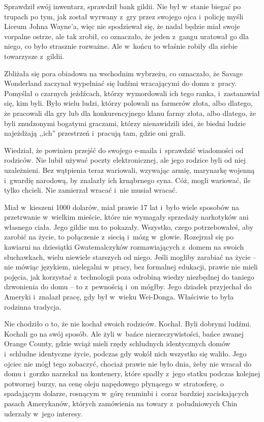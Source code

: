\documentclass[oneside,polish,11pt,rmheadings]{mwbk}
\begin{document}
Sprawdził swój inwentarz, sprawdził bank gildii. Nie był w~stanie biegać po trupach po tym, jak został wyrwany z~gry przez swojego ojca i~policję myśli Liceum Johna Wayne'a, więc nie spodziewał się, że nadal będzie miał swoje vorpalne ostrze, ale tak zrobił, co oznaczało, że jeden z~gangu uratował go dla niego, co było strasznie rozważne. Ale w~końcu to właśnie robiły dla siebie towarzysze z~gildii. 


Zbliżała się pora obiadowa na wschodnim wybrzeżu, co oznaczało, że Savage Wonderland zaczynał wypełniać się ludźmi wracającymi do domu z~pracy. Pomyślał o czarnych jeźdźcach, którzy wymordowali ich tego ranka, i~zastanawiał się, kim byli. Było wielu ludzi, którzy polowali na farmerów złota, albo dlatego, że pracowali dla gry lub dla konkurencyjnego klanu farmy złota, albo dlatego, że byli znudzonymi bogatymi graczami, którzy nienawidzili idei, że biedni ludzie najeżdżają ,,ich'' przestrzeń i~pracują tam, gdzie oni grali. 


Wiedział, że powinien przejść do swojego e-maila i~sprawdzić wiadomości od rodziców. Nie lubił używać poczty elektronicznej, ale jego rodzice byli od niej uzależnieni. Bez wątpienia teraz wariowali, wzywając armię, marynarkę wojenną i~gwardię narodową, by znalazły ich krnąbrnego syna. Cóż, mogli wariować, ile tylko chcieli. Nie zamierzał wracać i~nie musiał wracać. 


Miał w~kieszeni 1000 dolarów, miał prawie 17 lat i~było wiele sposobów na przetrwanie w~wielkim mieście, które nie wymagały sprzedaży narkotyków ani własnego ciała. Jego gildie mu to pokazały. Wszystko, czego potrzebowałeś, aby zarobić na życie, to połączenie z~siecią i~mózg w~głowie. Rozejrzał się po kawiarni na dziesiątki Gwatemalczyków rozmawiających z~domem na swoich słuchawkach, wielu niewiele starszych od niego. Jeśli mogliby zarabiać na życie -- nie mówiąc językiem, nielegalni w~pracy, bez formalnej edukacji, prawie nie mieli pojęcia, jak korzystać z~technologii poza odrobiną wiedzy niezbędnej do taniego dzwonienia do domu -- to z~pewnością i~on mógłby. Jego dziadek przyjechał do Ameryki i~znalazł pracę, gdy był w~wieku Wei-Donga. Właściwie to była rodzinna tradycja. 


Nie chodziło o to, że nie kochał swoich rodziców. Kochał. Byli dobrymi ludźmi. Kochali go na swój sposób. Ale żyli w~bańce nierzeczywistości, bańce zwanej Orange County, gdzie wciąż mieli rzędy schludnych identycznych domów i~schludne identyczne życie, podczas gdy wokół nich wszystko się waliło. Jego ojciec nie mógł tego zobaczyć, chociaż prawie nie było dnia, żeby nie wracał do domu i~gorzko narzekał na kontenery, które spadły z~jego statku podczas kolejnej potwornej burzy, na cenę oleju napędowego płynącego w~stratosferę, o spadającym dolarze, rosnącym w~górę renminbi i~coraz bardziej zaciskających pasach Amerykanów, których zamówienia na towary z~południowych Chin uderzały w~jego interesy. 
\end{document}
